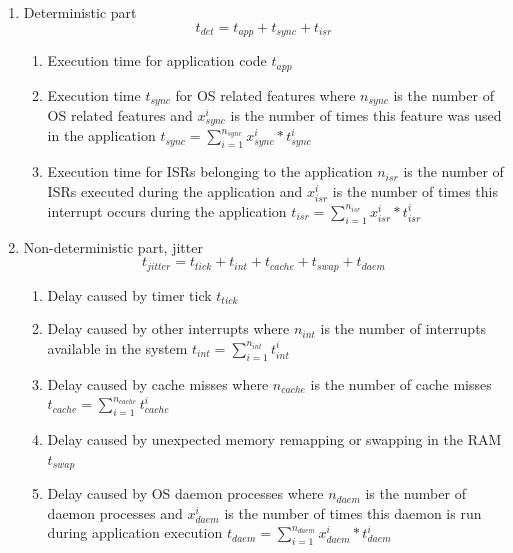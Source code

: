 \begin{enumerate}
	\item Deterministic part 
	\begin{equation}
			t_{det} = t_{app} + t_{sync} + t_{isr}
		\label{eq_det_app}
	\end{equation}  		
		\begin{enumerate}
			\item Execution time for application code $ t_{app} $ 
			\item Execution time $ t_{sync} $ for \ac{OS} related features where $ n_{sync} $ is the number of \ac{OS} 
						related features and $ x_{sync}^{i} $ is the number of times this feature was used in the application 
						$ t_{sync} = \sum\limits_{i=1}^{n_{sync}} {x_{sync}^{i} * t_{sync}^{i}} $
			\item Execution time for \acp{ISR} belonging to the application $ n_{isr} $ is the number of 
						\acp{ISR} executed during the application and $ x_{isr}^{i} $ is the number of times this interrupt
						occurs during the application
						$ t_{isr} = \sum\limits_{i=1}^{n_{isr}} {x_{isr}^{i} * t_{isr}^{i}} $						
		\end{enumerate}	
  \item Non-deterministic part, jitter 
  \begin{equation}
   t_{jitter} = t_{tick} + t_{int} + t_{cache} + t_{swap} + t_{daem} 		
   \label{eq_indet_app}
	\end{equation}
		\begin{enumerate}
			\item Delay caused by timer tick $ t_{tick} $
			\item Delay caused by other interrupts where $ n_{int} $ is the number of interrupts available in the system 
						$ t_{int} = \sum\limits_{i=1}^{n_{int}} {t_{int}^{i}} $
			\item Delay caused by cache misses where $ n_{cache} $ is the number of cache misses 
						$ t_{cache} =  \sum\limits_{i=1}^{n_{cache}} {t_{cache}^{i}}$
			\item Delay caused by unexpected memory remapping or swapping in the \ac{RAM} $ t_{swap} $  
			\item Delay caused by \ac{OS} daemon processes where $ n_{daem} $ is the number of daemon processes and
						$ x_{daem}^{i} $ is the number of times this daemon is run during application execution
						$ t_{daem} = \sum\limits_{i=1}^{n_{daem}} {x_{daem}^{i} * t_{daem}^{i}} $
		\end{enumerate}	
\end{enumerate}
 
